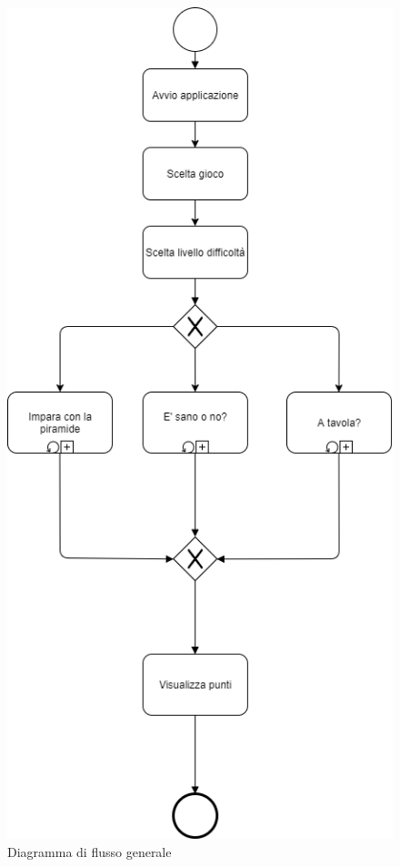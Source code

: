 \begin{figure}[htbp]
\centering
\includegraphics[scale=0.6]{Images/Flussogenerico}
\caption{Diagramma di flusso generale}
\label{fig:Diagramma di flusso generale}
\end{figure}
\clearpage

